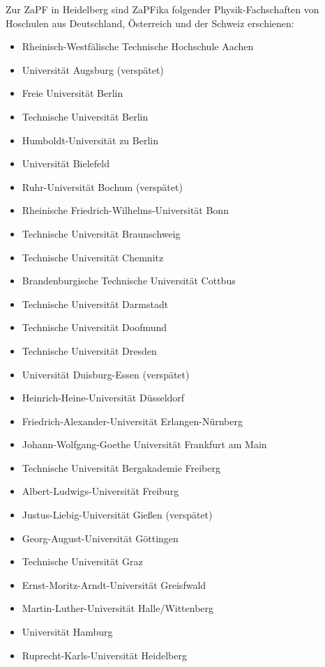 \label{chap:anwesend}
  Zur ZaPF in Heidelberg sind ZaPFika folgender Physik-Fachschaften von Hoschulen aus Deutschland, Österreich und der Schweiz erschienen:
  \begin{itemize}
    \item Rheinisch-Westfälische Technische Hochschule Aachen
    \item Universität Augsburg (verspätet)
    \item Freie Universität Berlin
    \item Technische Universität Berlin
    \item Humboldt-Universität zu Berlin
    \item Universität Bielefeld
    \item Ruhr-Universität Bochum (verspätet)
    \item Rheinische Friedrich-Wilhelms-Universität Bonn
    \item Technische Universität Braunschweig
    \item Technische Universität Chemnitz
    \item Brandenburgische Technische Universität Cottbus
    \item Technische Universität Darmstadt
    \item Technische Universität Doofmund
    \item Technische Universität Dresden
    \item Universität Duisburg-Essen (verspätet)
    \item Heinrich-Heine-Universität Düsseldorf
    \item Friedrich-Alexander-Universität Erlangen-Nürnberg
    \item Johann-Wolfgang-Goethe Universität Frankfurt am Main
    \item Technische Universität Bergakademie Freiberg
    \item Albert-Ludwigs-Universität Freiburg
    \item Justus-Liebig-Universität Gießen (verspätet)
    \item Georg-August-Universität Göttingen
    \item Technische Universität Graz
    \item Ernst-Moritz-Arndt-Universität Greisfwald
    \item Martin-Luther-Universität Halle/Wittenberg
    \item Universität Hamburg
    \item Ruprecht-Karls-Universität Heidelberg

\end{itemize}
